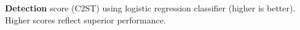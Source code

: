\begin{table}[!ht]  
    \centering
    \caption{\textbf{Detection} score (C$2$ST) using logistic regression classifier (higher is better). Higher scores reflect superior performance.} 
    \label{tbl:lr_detection}
    \begin{threeparttable}
    {
    \resizebox{\columnwidth}{!}
    {
    
  }
  }
	\end{threeparttable}
\end{table}